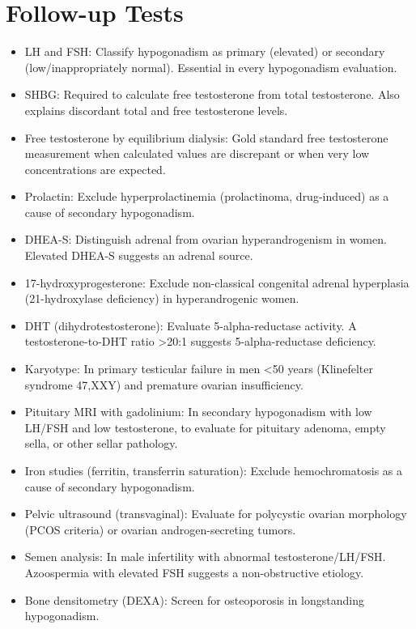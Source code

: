 \section*{Follow-up Tests}
\begin{itemize}
  \item LH and FSH: Classify hypogonadism as primary (elevated) or secondary (low/inappropriately normal). Essential in every hypogonadism evaluation.
  \item SHBG: Required to calculate free testosterone from total testosterone. Also explains discordant total and free testosterone levels.
  \item Free testosterone by equilibrium dialysis: Gold standard free testosterone measurement when calculated values are discrepant or when very low concentrations are expected.
  \item Prolactin: Exclude hyperprolactinemia (prolactinoma, drug-induced) as a cause of secondary hypogonadism.
  \item DHEA-S: Distinguish adrenal from ovarian hyperandrogenism in women. Elevated DHEA-S suggests an adrenal source.
  \item 17-hydroxyprogesterone: Exclude non-classical congenital adrenal hyperplasia (21-hydroxylase deficiency) in hyperandrogenic women.
  \item DHT (dihydrotestosterone): Evaluate 5-alpha-reductase activity. A testosterone-to-DHT ratio >20:1 suggests 5-alpha-reductase deficiency.
  \item Karyotype: In primary testicular failure in men <50 years (Klinefelter syndrome 47,XXY) and premature ovarian insufficiency.
  \item Pituitary MRI with gadolinium: In secondary hypogonadism with low LH/FSH and low testosterone, to evaluate for pituitary adenoma, empty sella, or other sellar pathology.
  \item Iron studies (ferritin, transferrin saturation): Exclude hemochromatosis as a cause of secondary hypogonadism.
  \item Pelvic ultrasound (transvaginal): Evaluate for polycystic ovarian morphology (PCOS criteria) or ovarian androgen-secreting tumors.
  \item Semen analysis: In male infertility with abnormal testosterone/LH/FSH. Azoospermia with elevated FSH suggests a non-obstructive etiology.
  \item Bone densitometry (DEXA): Screen for osteoporosis in longstanding hypogonadism.
\end{itemize}

